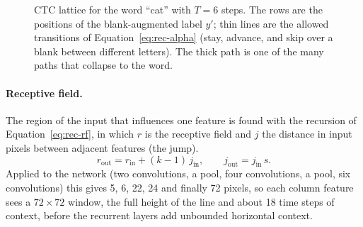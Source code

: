 \begin{figure}[h]
\centering
{}
\caption{CTC lattice for the word ``cat'' with $T=6$ steps. The rows are the positions of the blank-augmented label $y'$; thin lines are the allowed transitions of Equation~\ref{eq:rec-alpha} (stay, advance, and skip over a blank between different letters). The thick path is one of the many paths that collapse to the word.}
\label{fig:rec-ctc}
\end{figure}

\paragraph{Receptive field.}
The region of the input that influences one feature is found with the recursion of Equation~\ref{eq:rec-rf}, in which $r$ is the receptive field and $j$ the distance in input pixels between adjacent features (the jump).
\begin{equation}
r_{\mathrm{out}}=r_{\mathrm{in}}+(k-1)\,j_{\mathrm{in}},\qquad j_{\mathrm{out}}=j_{\mathrm{in}}\,s.
\label{eq:rec-rf}
\end{equation}
Applied to the network (two convolutions, a pool, four convolutions, a pool, six convolutions) this gives 5, 6, 22, 24 and finally 72 pixels, so each column feature sees a $72\times72$ window, the full height of the line and about 18 time steps of context, before the recurrent layers add unbounded horizontal context.



